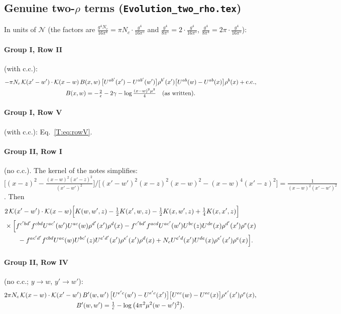 \documentclass[10pt]{article}
\numberwithin{equation}{section}
\newcommand{\KK}{\mathcal K}
\newcommand{\NN}{\mathcal N}
\begin{document}
\subsection{Genuine two-\texorpdfstring{$\rho$}{rho} terms (\texttt{Evolution\_two\_rho.tex})}\label{T:sec:genuine}
In units of $\NN$ (the factors are $\frac{g^4N_c}{16\pi^4}=\pi N_c\cdot\frac{g^4}{16\pi^5}$ and $\frac{g^4}{8\pi^5}=2\cdot\frac{g^4}{16\pi^5}$, $\frac{g^4}{8\pi^4}=2\pi\cdot\frac{g^4}{16\pi^5}$):
\paragraph{Group I, Row II} (with c.c.):
\begin{gather}
-\pi N_c\,\KK(x'-w')\cdot\KK(x-w)\,B(x,w)\,\big[U^{ab'}(x')-U^{ab'}(w')\big]\rho^{b'}(x')\big[U^{ab}(w)-U^{ab}(x)\big]\rho^b(x)+{\rm c.c.},\notag\\
B(x,w)=-\tfrac2\epsilon-2\gamma-\log\tfrac{(x-w)^2\mu^2}{4}\quad\text{(as written)}.
\end{gather}
\paragraph{Group I, Row V} (with c.c.): Eq.~\eqref{T:eq:rowV}.
\paragraph{Group II, Row I} (no c.c.). The kernel of the notes simplifies: $\big[(x-z)^2-\frac{(x-w)^2(x'-z)^2}{(x'-w')^2}\big]\big/\big[(x'-w')^2(x-z)^2(x-w)^2-(x-w)^4(x'-z)^2\big]=\frac{1}{(x-w)^2(x'-w')^2}$. Then
\begin{align}
&2\,\KK(x'-w')\cdot\KK(x-w)\Big[K(w,w',z)-\tfrac12K(x',w,z)-\tfrac12K(x,w',z)+\tfrac14K(x,x',z)\Big]\notag\\
&\times\Big[f^{c'bd'}f^{cbd}U^{ac'}(w')U^{ac}(w)\rho^{d'}(x')\rho^d(x)-f^{c'bd'}f^{acd}U^{ac'}(w')U^{bc}(z)U^{de}(x)\rho^{d'}(x')\rho^e(x)\notag\\
&\qquad-f^{ac'd'}f^{cbd}U^{ac}(w)U^{bc'}(z)U^{e'd'}(x')\rho^{e'}(x')\rho^d(x)+N_cU^{e'd}(x')U^{de}(x)\rho^{e'}(x')\rho^e(x)\Big].
\end{align}
\paragraph{Group II, Row IV} (no c.c.; $y\to w$, $y'\to w'$):
\begin{gather}
2\pi N_c\,\KK(x-w)\cdot\KK(x'-w')\,B'(w,w')\,\big[U^{e'c}(w')-U^{e'c}(x')\big]\big[U^{ec}(w)-U^{ec}(x)\big]\rho^{e'}(x')\rho^e(x),\notag\\
B'(w,w')=\tfrac1{\bar\epsilon}-\log\big(4\pi^2\mu^2(w-w')^2\big).
\end{gather}
\end{document}
